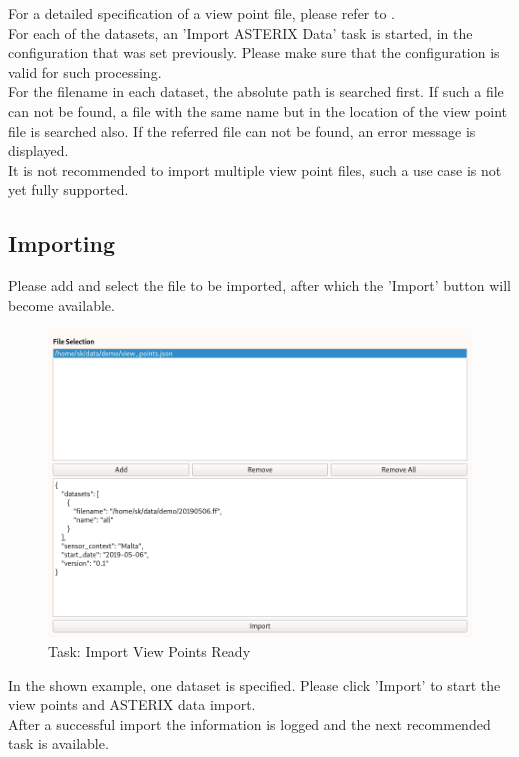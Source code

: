 For a detailed specification of a view point file, please refer to . \\

For each of the datasets, an 'Import ASTERIX Data' task is started, in the configuration that was set previously. Please make sure that the configuration is valid for such processing. \\

For the filename in each dataset, the absolute path is searched first. If such a file can not be found, a file with the same name but in the location of the view point file is searched also. If the referred file can not be found, an error message is displayed. \\

It is not recommended to import multiple view point files, such a use case is not yet fully supported.

\subsection{Importing}

Please add and select the file to be imported, after which the 'Import' button will become available. \\

\begin{figure}[H]
    \includegraphics[width=16cm,frame]{figures/view_point_import_ready.png}
  \caption{Task: Import View Points Ready}
\end{figure}

In the shown example, one dataset is specified. Please click 'Import' to start the view points and ASTERIX data import. \\

After a successful import the information is logged and the next recommended task is available.

